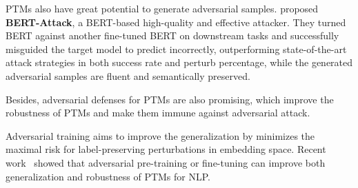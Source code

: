 \documentclass[fleqn]{SCYE-arxiv}
\begin{document}
\begin{multicols}{2}
PTMs also have great potential to generate adversarial samples.
\citet{li2020bertattack} proposed \textbf{BERT-Attack}, a BERT-based high-quality and effective attacker. They turned BERT against another fine-tuned BERT on downstream tasks and successfully misguided the target model to predict incorrectly, outperforming state-of-the-art attack strategies in both success rate and perturb percentage, while the generated adversarial samples are fluent and semantically preserved.


Besides, adversarial defenses for PTMs are also promising, which improve the robustness of PTMs and make them immune against adversarial attack.

Adversarial training aims to improve the generalization by minimizes the maximal risk for label-preserving perturbations in embedding space.
Recent work~\cite{zhu2020freelb,liu2020adversarial} showed that adversarial pre-training or fine-tuning can improve both generalization and
robustness of PTMs for NLP.



%
%
%
%


\end{multicols}
\end{document}
